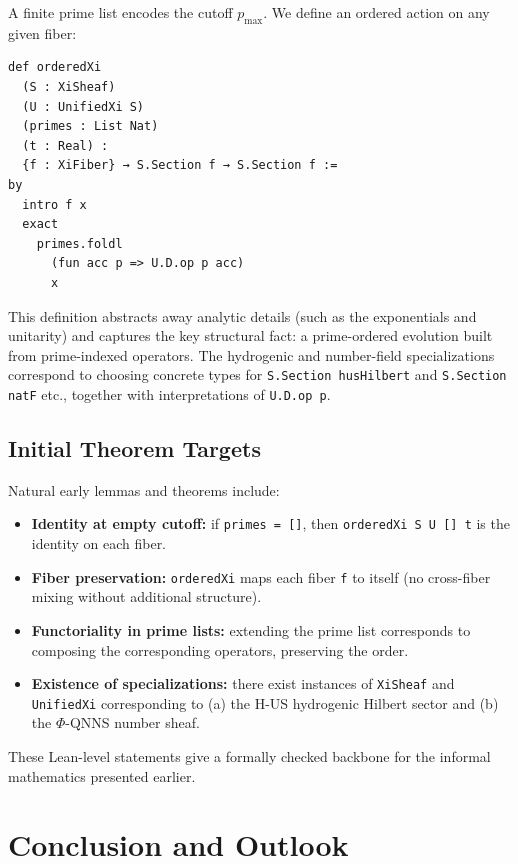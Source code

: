 \documentclass[11pt]{article}
\begin{document}
A finite prime list encodes the cutoff $p_{\max}$. We define an
ordered action on any given fiber:

\begin{verbatim}
def orderedXi
  (S : XiSheaf)
  (U : UnifiedXi S)
  (primes : List Nat)
  (t : Real) :
  {f : XiFiber} → S.Section f → S.Section f :=
by
  intro f x
  exact
    primes.foldl
      (fun acc p => U.D.op p acc)
      x
\end{verbatim}

This definition abstracts away analytic details (such as the
exponentials and unitarity) and captures the key structural fact: a
prime-ordered evolution built from prime-indexed operators. The
hydrogenic and number-field specializations correspond to choosing
concrete types for \verb|S.Section husHilbert| and \verb|S.Section natF|
etc., together with interpretations of \verb|U.D.op p|.

\subsection{Initial Theorem Targets}

Natural early lemmas and theorems include:
\begin{itemize}
  \item \textbf{Identity at empty cutoff:} if \verb|primes = []|,
  then \verb|orderedXi S U [] t| is the identity on each fiber.

  \item \textbf{Fiber preservation:} \verb|orderedXi| maps each fiber
  \verb|f| to itself (no cross-fiber mixing without additional
  structure).

  \item \textbf{Functoriality in prime lists:} extending the prime list
  corresponds to composing the corresponding operators, preserving the
  order.

  \item \textbf{Existence of specializations:} there exist instances of
  \verb|XiSheaf| and \verb|UnifiedXi| corresponding to (a) the H-US
  hydrogenic Hilbert sector and (b) the $\Phi$-QNNS number sheaf.
\end{itemize}
These Lean-level statements give a formally checked backbone for the
informal mathematics presented earlier.

\section{Conclusion and Outlook}
\end{document}
